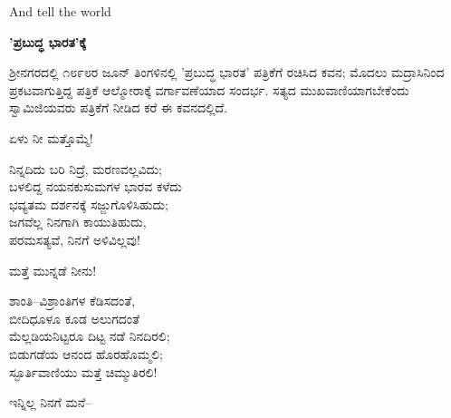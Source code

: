 And tell the world

\begin{myquote}
\end{myquote}

\selectkan

\begin{center}
\textbf{'ಪ್ರಬುದ್ಧ ಭಾರತ'ಕ್ಕೆ}
\end{center}

ಶ‍್ರೀನಗರದಲ್ಲಿ ೧೮೯೮ರ ಜೂನ್ ತಿಂಗಳಿನಲ್ಲಿ 'ಪ್ರಬುದ್ಧ ಭಾರತ' ಪತ್ರಿಕೆಗೆ ರಚಿಸಿದ ಕವನ; ಮೊದಲು ಮದ್ರಾಸಿನಿಂದ ಪ್ರಕಟವಾಗುತ್ತಿದ್ದ ಪತ್ರಿಕೆ ಆಲ್ಮೋರಾಕ್ಕೆ ವರ್ಗಾವಣೆಯಾದ ಸಂದರ್ಭ. ಸತ್ಯದ ಮುಖವಾಣಿಯಾಗಬೇಕೆಂದು ಸ್ವಾಮಿಜಿಯವರು ಪತ್ರಿಕೆಗೆ ನೀಡಿದ ಕರೆ ಈ ಕವನದಲ್ಲಿದೆ.

ಏಳು ನೀ ಮತ್ತೊಮ್ಮೆ!

\begin{myquote}
ನಿನ್ನದಿದು ಬರಿ ನಿದ್ರೆ, ಮರಣವಲ್ಲವಿದು;\\ಬಳಲಿದ್ದ ನಯನಕುಸುಮಗಳ ಭಾರವ ಕಳೆದು\\ಭವ್ಯತಮ ದರ್ಶನಕ್ಕೆ ಸಜ್ಜುಗೊಳಿಸಿಹುದು;\\ಜಗವೆಲ್ಲ ನಿನಗಾಗಿ ಕಾಯುತಿಹುದು,\\ಪರಮಸತ್ಯವೆ, ನಿನಗೆ ಅಳಿವಿಲ್ಲವು!
\end{myquote}

ಮತ್ತೆ ಮುನ್ನಡೆ ನೀನು!

\begin{myquote}
ಶಾಂತಿ–ವಿಶ್ರಾಂತಿಗಳ ಕೆಡಿಸದಂತೆ,\\ಬೀದಿಧೂಳೂ ಕೂಡ ಅಲುಗದಂತೆ\\ಮೆಲ್ಲಡಿಯನಿಟ್ಟರೂ ದಿಟ್ಟ ನಡೆ ನಿನದಿರಲಿ;\\ಬಿಡುಗಡೆಯ ಆನಂದ ಹೊರಹೊಮ್ಮಲಿ;\\ಸ್ಫೂರ್ತಿವಾಣಿಯು ಮತ್ತೆ ಚಿಮ್ಮುತಿರಲಿ!
\end{myquote}

ಇನ್ನಿಲ್ಲ ನಿನಗೆ ಮನೆ–

